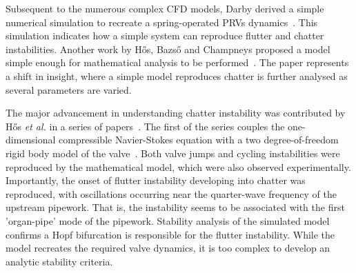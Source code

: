 Subsequent to the numerous complex CFD models, Darby derived a simple numerical simulation to recreate a spring-operated PRVs dynamics~\cite{Darby2013TheModel}. This simulation indicates how a simple system can reproduce flutter and chatter instabilities. Another work by H\H{o}s, Bazs\H{o} and Champneys proposed a model simple enough for mathematical analysis to be performed~\cite{Hos2015ModelPipe}. The paper represents a shift in insight, where a simple model reproduces chatter is further analysed as several parameters are varied.


The major advancement in understanding chatter instability was contributed by H\H{o}s \emph{et al.}
in a series of papers~\cite{Hos2014DynamicMechanisms,Hos2015DynamicModelling,Hos2016DynamicService,Hos2017DynamicRecommendations}. The first of the series couples the one-dimensional compressible Navier-Stokes equation with a two degree-of-freedom rigid body model of the valve~\cite{Hos2014DynamicMechanisms}.
Both valve jumps and cycling instabilities were reproduced by the mathematical model, which were also observed experimentally. Importantly, the onset of flutter instability developing into chatter was reproduced, with oscillations occurring near the quarter-wave frequency of the upstream pipework. That is, the instability seems to be associated with the first 'organ-pipe' mode of the pipework. Stability analysis of the simulated model confirms a Hopf bifurcation is responsible for the flutter instability. While the model recreates the required valve dynamics, it is too complex to develop an analytic stability criteria. %

